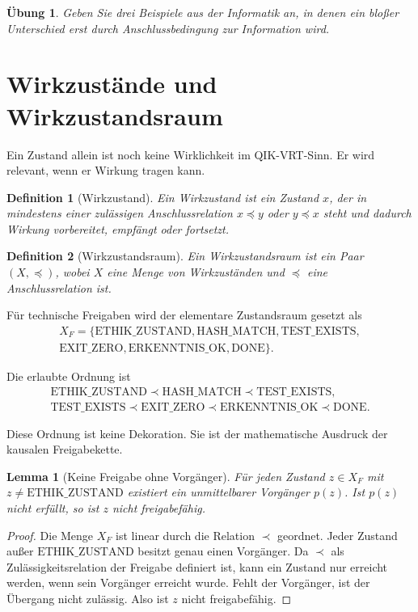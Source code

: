 \documentclass[11pt,a4paper,oneside]{scrartcl}
\theoremstyle{qikstyle}
\newtheorem{definition}{Definition}[section]
\newtheorem{lemma}[satz]{Lemma}
\newtheorem{uebung}{Übung}[section]
\newcommand{\DONE}{\mathrm{DONE}}
\newcommand{\HASH}{\mathrm{HASH\_MATCH}}
\newcommand{\TEST}{\mathrm{TEST\_EXISTS}}
\newcommand{\EXIT}{\mathrm{EXIT\_ZERO}}
\newcommand{\ERK}{\mathrm{ERKENNTNIS\_OK}}
\newcommand{\ETH}{\mathrm{ETHIK\_ZUSTAND}}
\begin{document}
\begin{uebung}
Geben Sie drei Beispiele aus der Informatik an, in denen ein bloßer Unterschied erst durch Anschlussbedingung zur Information wird.
\end{uebung}
\newpage

\section{Wirkzustände und Wirkzustandsraum}

Ein Zustand allein ist noch keine Wirklichkeit im QIK-VRT-Sinn. Er wird relevant, wenn er Wirkung tragen kann.

\begin{definition}[Wirkzustand]
Ein Wirkzustand ist ein Zustand \(x\), der in mindestens einer zulässigen Anschlussrelation \(x \preceq y\) oder \(y \preceq x\) steht und dadurch Wirkung vorbereitet, empfängt oder fortsetzt.
\end{definition}

\begin{definition}[Wirkzustandsraum]
Ein Wirkzustandsraum ist ein Paar \((X,\preceq)\), wobei \(X\) eine Menge von Wirkzuständen und \(\preceq\) eine Anschlussrelation ist.
\end{definition}

Für technische Freigaben wird der elementare Zustandsraum gesetzt als
\[
\begin{gathered}
X_F = \{\ETH,\HASH,\TEST,\\
\EXIT,\ERK,\DONE\}.
\end{gathered}
\]

Die erlaubte Ordnung ist
\[
\begin{gathered}
\ETH \prec \HASH \prec \TEST,\\
\TEST \prec \EXIT \prec \ERK \prec \DONE.
\end{gathered}
\]

Diese Ordnung ist keine Dekoration. Sie ist der mathematische Ausdruck der kausalen Freigabekette.

\begin{lemma}[Keine Freigabe ohne Vorgänger]
Für jeden Zustand \(z \in X_F\) mit \(z \neq \ETH\) existiert ein unmittelbarer Vorgänger \(p(z)\). Ist \(p(z)\) nicht erfüllt, so ist \(z\) nicht freigabefähig.
\end{lemma}

\begin{proof}
Die Menge \(X_F\) ist linear durch die Relation \(\prec\) geordnet. Jeder Zustand außer \(\ETH\) besitzt genau einen Vorgänger. Da \(\prec\) als Zulässigkeitsrelation der Freigabe definiert ist, kann ein Zustand nur erreicht werden, wenn sein Vorgänger erreicht wurde. Fehlt der Vorgänger, ist der Übergang nicht zulässig. Also ist \(z\) nicht freigabefähig.
\end{proof}
\newpage
\end{document}
